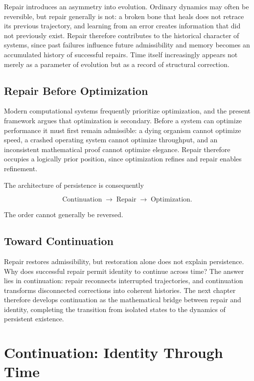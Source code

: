 \documentclass[11pt,oneside]{book}
\numberwithin{equation}{chapter}
\theoremstyle{definition}
\theoremstyle{plain}
\begin{document}
Repair introduces an asymmetry into evolution. Ordinary dynamics may often be reversible, but repair generally is not: a broken bone that heals does not retrace its previous trajectory, and learning from an error creates information that did not previously exist. Repair therefore contributes to the historical character of systems, since past failures influence future admissibility and memory becomes an accumulated history of successful repairs. Time itself increasingly appears not merely as a parameter of evolution but as a record of structural correction.

\section{Repair Before Optimization}

Modern computational systems frequently prioritize optimization, and the present framework argues that optimization is secondary. Before a system can optimize performance it must first remain admissible: a dying organism cannot optimize speed, a crashed operating system cannot optimize throughput, and an inconsistent mathematical proof cannot optimize elegance. Repair therefore occupies a logically prior position, since optimization refines and repair enables refinement.

The architecture of persistence is consequently

\[
\text{Continuation}
\;\rightarrow\;
\text{Repair}
\;\rightarrow\;
\text{Optimization}.
\]

The order cannot generally be reversed.

\section{Toward Continuation}

Repair restores admissibility, but restoration alone does not explain persistence. Why does successful repair permit identity to continue across time? The answer lies in continuation: repair reconnects interrupted trajectories, and continuation transforms disconnected corrections into coherent histories. The next chapter therefore develops continuation as the mathematical bridge between repair and identity, completing the transition from isolated states to the dynamics of persistent existence.

\chapter{Continuation: Identity Through Time}
\end{document}
